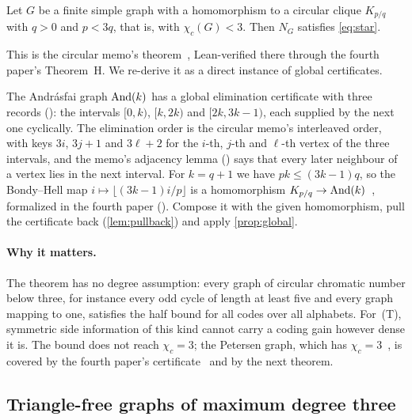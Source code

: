 \begin{theorem}\label{thm:circular}
Let $G$ be a finite simple graph with a homomorphism to a circular clique $K_{p/q}$ with $q>0$ and $p<3q$, that is,
with $\chi_c(G)<3$. Then $N_G$ satisfies \eqref{eq:star}.
\end{theorem}

This is the circular memo's theorem~\cite[Corollary~3.2]{CircularMemo2026}, Lean-verified there through the fourth
paper's Theorem~H. We re-derive it as a direct instance of global certificates.

\begin{outline}
The Andrásfai graph $\operatorname{And}(k)$ has a global elimination certificate with three records
(): the intervals $[0,k)$, $[k,2k)$ and $[2k,3k-1)$, each supplied by the next one cyclically.
The elimination order is the circular memo's interleaved order, with keys $3i$, $3j+1$ and $3\ell+2$ for the $i$-th,
$j$-th and $\ell$-th vertex of the three intervals, and the memo's adjacency lemma ()
says that every later neighbour of a vertex lies in the next interval. For $k=q+1$ we have $pk\le(3k-1)q$, so the
Bondy--Hell map $i\mapsto\lfloor(3k-1)i/p\rfloor$ is a homomorphism $K_{p/q}\to\operatorname{And}(k)$~\cite{BondyHell1990}, formalized
in the fourth paper (). Compose it with the given homomorphism, pull the
certificate back (\cref{lem:pullback}) and apply \cref{prop:global}.
\end{outline}

\paragraph{Why it matters.} The theorem has no degree assumption: every graph of circular chromatic number below three,
for instance every odd cycle of length at least five and every graph mapping to one, satisfies the half bound for all
codes over all alphabets. For~(T), symmetric side information of this kind cannot carry a coding gain however dense it
is. The bound does not reach $\chi_c=3$; the Petersen graph, which has $\chi_c=3$~\cite{JHS1997}, is covered by the
fourth paper's certificate~\cite[Corollary~6.9]{FourthPaper2026} and by the next theorem.

\subsection{Triangle-free graphs of maximum degree three}\label{sec:N3}

